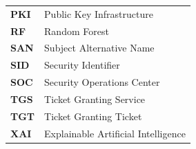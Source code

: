 \begin{singlespace}
\begin{tabularx}{\textwidth}{lX}
\textbf{PKI} & Public Key Infrastructure \\
\textbf{RF} & Random Forest \\
\textbf{SAN} & Subject Alternative Name \\
\textbf{SID} & Security Identifier \\
\textbf{SOC} & Security Operations Center \\
\textbf{TGS} & Ticket Granting Service \\
\textbf{TGT} & Ticket Granting Ticket \\
\textbf{XAI} & Explainable Artificial Intelligence \\
\end{tabularx}
\end{singlespace}
